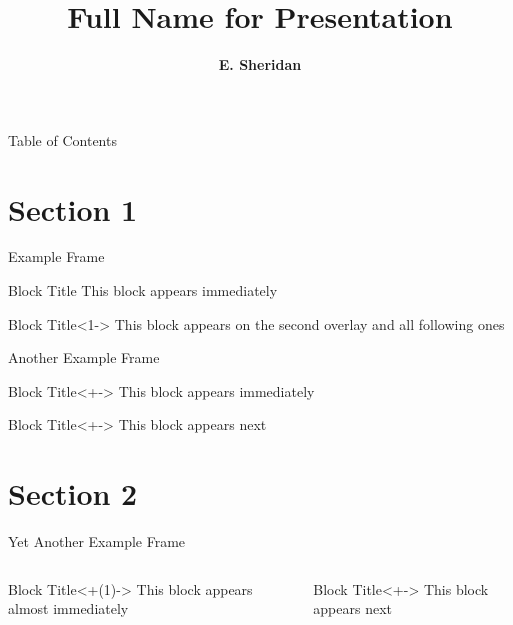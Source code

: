 \documentclass[]{beamer} %
\title[Short Name]{Full Name for Presentation}
\author[E. Sheridan]{\textbf{E. Sheridan}\inst{1}}
\institute{Vanderbilt University\inst{1}}
\begin{document}
\frame{\titlepage}

\begin{frame}{Table of Contents}
\tableofcontents
\end{frame}

\section{Section 1}

\begin{frame}{Example Frame}
    \begin{block}{Block Title}
        This block appears immediately
    \end{block}
    \begin{block}{Block Title}<1->
        This block appears on the second overlay and all following ones 
    \end{block}
\end{frame}

\begin{frame}{Another Example Frame}
    \begin{block}{Block Title}<+->
        This block appears immediately
    \end{block}
    \begin{block}{Block Title}<+->
        This block appears next
    \end{block}
\end{frame}

\section{Section 2}

\begin{frame}{Yet Another Example Frame}
    \begin{columns}
        \begin{column}{0.4\linewidth}
            \begin{block}{Block Title}<+(1)->
                This block appears almost immediately
            \end{block}
        \end{column}
        \begin{column}{0.4\linewidth}
            \begin{block}{Block Title}<+->
                This block appears next
            \end{block}
        \end{column}
    \end{columns}
\end{frame}
\end{document}
